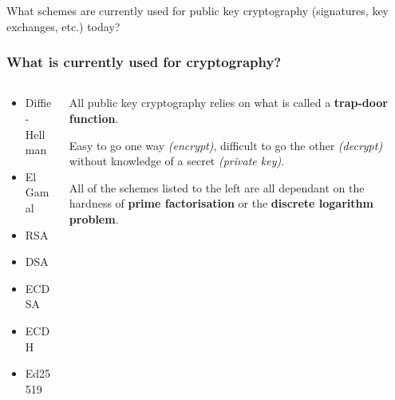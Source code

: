 \documentclass[
aspectratio=169, %
t, %
onlytextwidth, %
10pt, %
]{beamer}
\begin{document}

\begin{frame}
    \begin{adjustwidth}{0cm}{0.15\textwidth} %
        {\Huge\textcolor{ICLBlue}{{\ImperialSansSemiBold What schemes are currently used for public key cryptography (signatures, key exchanges, etc.) today?}}}
    \end{adjustwidth}
\end{frame}


\begin{frame}
    \frametitle{What is currently used for cryptography?}

    \begin{columns}[T] %
        \begin{column}{0.33\linewidth} %
            \begin{itemize}
                \item Diffie-Hellman
                \item El Gamal
                \item RSA
                \item DSA
                \item ECDSA
                \item ECDH
                \item Ed25519
            \end{itemize}
        \end{column}
        \begin{column}{0.63\linewidth} %
            All public key cryptography relies on what is called a \textbf{trap-door function}.

            Easy to go one way \textit{(encrypt)}, difficult to go the other \textit{(decrypt)} without knowledge of a secret \textit{(private key)}.

            All of the schemes listed to the left are all dependant on the hardness of \textbf{prime factorisation} or the \textbf{discrete logarithm problem}.
        \end{column}
    \end{columns}
\end{frame}
\end{document}
